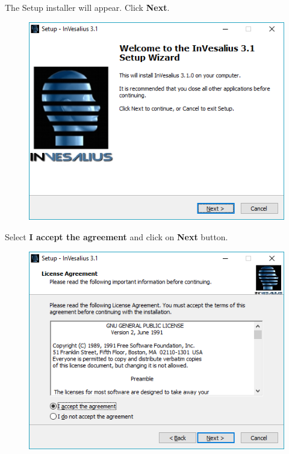 \hspace{.2cm}

The Setup installer will appear. Click \textbf{Next}.

\begin{figure}[!htb]
\centering
\includegraphics[scale=0.7]{../user_guide_figures/invesalius_screen/installation_welcome_en.png}
\end{figure}

\newpage

Select \textbf{I accept the agreement} and click on \textbf{Next} button.

\begin{figure}[!htb] 
\centering
\includegraphics[scale=0.7]{../user_guide_figures/invesalius_screen/installation_license_en.png}
\end{figure}

